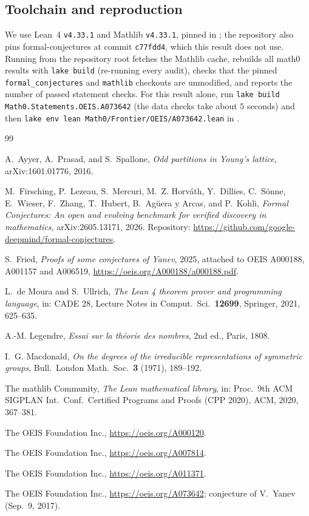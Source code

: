 \documentclass[11pt]{amsart}
\theoremstyle{plain}
\theoremstyle{definition}
\begin{document}
\subsection*{Toolchain and reproduction}
We use Lean~4 \cite{Lean4} \texttt{v4.33.1} and Mathlib \cite{Mathlib} \texttt{v4.33.1}, pinned in ; the repository also pins formal-conjectures \cite{FC} at commit \texttt{c77fdd4}, which this result does not use. Running  from the repository root fetches the Mathlib cache, rebuilds all math0 results with \texttt{lake build} (re-running every audit), checks that the pinned \texttt{formal\_conjectures} and \texttt{mathlib} checkouts are unmodified, and reports the number of passed statement checks. For this result alone, run \texttt{lake build Math0.Statements.OEIS.A073642} (the data checks take about $5$ seconds) and then \texttt{lake env lean Math0/Frontier/OEIS/A073642.lean} in .

{\small
\begin{thebibliography}{99}

A.~Ayyer, A.~Prasad, and S.~Spallone, \emph{Odd partitions in Young's lattice}, arXiv:1601.01776, 2016.

M.~Firsching, P.~Lezeau, S.~Mercuri, M.~Z. Horv\'ath, Y.~Dillies, C.~S\"onne, E.~Wieser, F.~Zhang, T.~Hubert, B.~Ag\"uera y Arcas, and P.~Kohli, \emph{Formal Conjectures: An open and evolving benchmark for verified discovery in mathematics}, arXiv:2605.13171, 2026. Repository: \url{https://github.com/google-deepmind/formal-conjectures}.

S.~Fried, \emph{Proofs of some conjectures of Yanev}, 2025, attached to OEIS A000188, A001157 and A006519, \url{https://oeis.org/A000188/a000188.pdf}.

L.~de Moura and S.~Ullrich, \emph{The Lean 4 theorem prover and programming language}, in: CADE 28, Lecture Notes in Comput.\ Sci.\ \textbf{12699}, Springer, 2021, 625--635.

A.-M. Legendre, \emph{Essai sur la th\'eorie des nombres}, 2nd ed., Paris, 1808.

I.~G. Macdonald, \emph{On the degrees of the irreducible representations of symmetric groups}, Bull.\ London Math.\ Soc.\ \textbf{3} (1971), 189--192.

The mathlib Community, \emph{The Lean mathematical library}, in: Proc.\ 9th ACM SIGPLAN Int.\ Conf.\ Certified Programs and Proofs (CPP 2020), ACM, 2020, 367--381.

The OEIS Foundation Inc., \url{https://oeis.org/A000120}.

The OEIS Foundation Inc., \url{https://oeis.org/A007814}.

The OEIS Foundation Inc., \url{https://oeis.org/A011371}.

The OEIS Foundation Inc., \url{https://oeis.org/A073642}; conjecture of V.~Yanev (Sep.~9, 2017).

\end{thebibliography}
}
\end{document}
